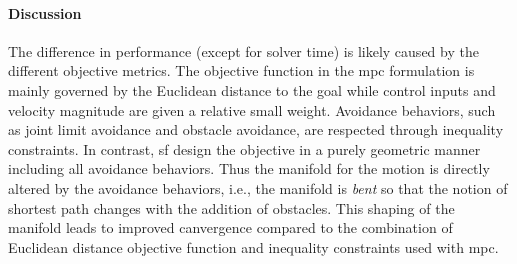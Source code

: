 \paragraph{Discussion}
The difference in performance (except for solver time) is likely caused by
the different objective metrics. The objective function in the \ac{mpc}
formulation is mainly governed by the Euclidean distance to the goal while
control inputs and velocity magnitude are given a relative small weight.
Avoidance behaviors, such as joint limit avoidance and obstacle avoidance,
are respected through inequality constraints. In contrast, \ac{sf} design the
objective in a purely geometric manner including all avoidance behaviors.
Thus the manifold for the motion is directly altered by the avoidance
behaviors, i.e., the manifold is \textit{bent} \cite{Ratliff2020} so that
the notion of shortest path changes with the addition of obstacles. This
shaping of the manifold leads to improved canvergence compared to the
combination of Euclidean distance objective function and inequality
constraints used with \ac{mpc}.
